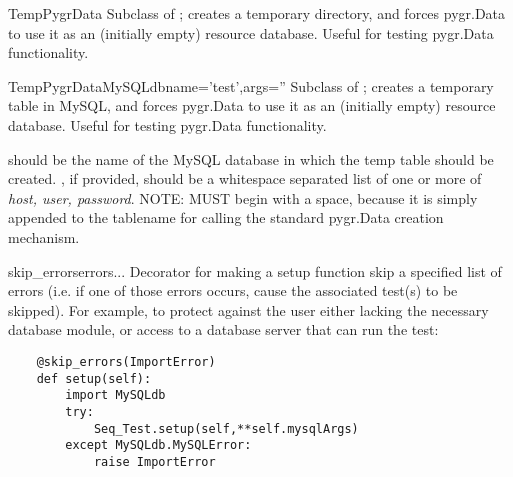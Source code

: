 \documentclass{howto}
\begin{document}
\begin{funcdesc}{TempPygrData}{}
  Subclass of ; creates a temporary directory,
  and forces pygr.Data to use it as an (initially
  empty) resource database.  Useful for testing pygr.Data functionality.  
\end{funcdesc}

\begin{funcdesc}{TempPygrDataMySQL}{dbname='test',args=''}
  Subclass of ; creates a temporary table in MySQL,
  and forces pygr.Data to use it as an (initially
  empty) resource database.  Useful for testing pygr.Data functionality. 

   should be the name of the MySQL database in which the temp
  table should be created.  , if provided, should be a whitespace
  separated list of one or more of {\em host, user, password}.  NOTE: 
  MUST begin with a space, because it is simply appended to the tablename for
  calling the standard pygr.Data creation mechanism.
\end{funcdesc}

\begin{funcdesc}{skip_errors}{errors...}
  Decorator for making a setup function skip a specified list of errors
  (i.e. if one of those errors occurs, cause the associated test(s) to be skipped).
  For example, to protect against the user either lacking the necessary 
  database module, or access to a database server that can run the test:
\begin{verbatim}
    @skip_errors(ImportError)
    def setup(self):
        import MySQLdb
        try:
            Seq_Test.setup(self,**self.mysqlArgs)
        except MySQLdb.MySQLError:
            raise ImportError
\end{verbatim}
\end{funcdesc}
\end{document}
